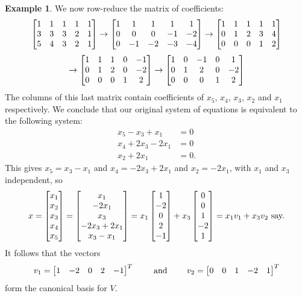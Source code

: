 \documentclass[reqno]{amsart}
\theoremstyle{definition}
\newtheorem{example}[theorem]{Example}
\begin{document}
\begin{example}
 We now row-reduce the matrix of coefficients:
 \[
    \left[\begin{matrix}
      1 & 1 & 1 & 1 & 1 \\
      3 & 3 & 3 & 2 & 1 \\
      5 & 4 & 3 & 2 & 1
    \end{matrix}\right]
    \to
    \left[\begin{matrix}
      1 & 1 & 1 & 1 & 1 \\
      0 & 0 & 0 &-1 &-2 \\
      0 &-1 &-2 &-3 & -4
    \end{matrix}\right]
    \to
    \left[\begin{matrix}
      1 & 1 & 1 & 1 & 1 \\
      0 & 1 & 2 & 3 & 4 \\
      0 & 0 & 0 & 1 & 2
    \end{matrix}\right]
 \]
 \[
    \to
    \left[\begin{matrix}
      1 & 1 & 1 & 0 &-1 \\
      0 & 1 & 2 & 0 &-2 \\
      0 & 0 & 0 & 1 & 2
    \end{matrix}\right]
    \to
    \left[\begin{matrix}
      1 & 0 &-1 & 0 & 1 \\
      0 & 1 & 2 & 0 &-2 \\
      0 & 0 & 0 & 1 & 2
    \end{matrix}\right]
 \]
 The columns of this last matrix contain coefficients of $x_5$, $x_4$,
 $x_3$, $x_2$ and $x_1$ respectively.  We conclude that our original
 system of equations is equivalent to the following system:
 \begin{align*}
  x_5 - x_3 + x_1 &= 0 \\
  x_4 + 2x_3 -2x_1 &= 0 \\
  x_2 + 2x_1 &= 0.
 \end{align*}
 This gives $x_5=x_3-x_1$ and $x_4=-2x_3+2x_1$ and $x_2=-2x_1$, with
 $x_1$ and $x_3$ independent, so
 \[ x
    = \left[\begin{matrix} x_1 \\ x_2 \\ x_3 \\ x_4 \\ x_5 \end{matrix}\right]
    = \left[\begin{matrix} x_1 \\ -2x_1 \\ x_3 \\ -2x_3+2x_1 \\ x_3-x_1 \end{matrix}\right]
    = x_1 \left[\begin{matrix} 1 \\ -2 \\ 0 \\ 2 \\ -1 \end{matrix}\right] +
      x_3 \left[\begin{matrix} 0 \\ 0 \\ 1 \\ -2 \\ 1 \end{matrix}\right]
    = x_1v_1 + x_3v_2 \text{ say.}
 \]
 It follows that the vectors
 \[ v_1 = \left[\begin{matrix} 1 & -2 & 0 & 2 & -1 \end{matrix}\right]^T
    \hspace{2em} \text{ and } \hspace{2em}
    v_2 = \left[\begin{matrix} 0 & 0 & 1 & -2 & 1 \end{matrix}\right]^T
 \]
 form the canonical basis for $V$.
\end{example}
\end{document}
